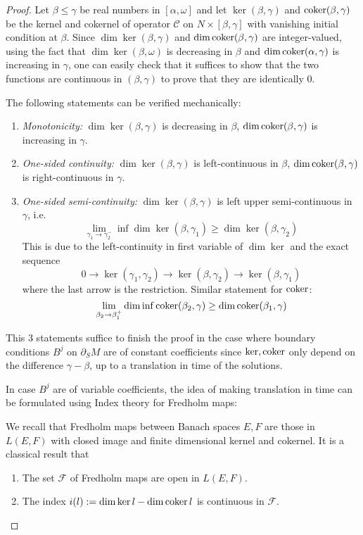 \begin{proof}
Let \(\beta \leq \gamma\) be real numbers in \([\alpha,\omega]\) and let \(\ker
(\beta,\gamma)\) and \(\mathop{\rm coker}\nolimits (\beta,\gamma)\) be the kernel and cokernel of operator
\(\mathcal{C}\) on \(N\times [\beta,\gamma]\) with vanishing initial condition at \(\beta\). Since \(\dim \ker (\beta,\gamma)\) and \(\dim\mathop{\rm coker}\nolimits (\beta,\gamma)\) are
integer-valued, using the fact that \(\dim \ker (\beta,\omega)\) is decreasing in \(\beta\) and \(\dim\mathop{\rm coker}\nolimits (\alpha,\gamma)\) is increasing in \(\gamma\), one can
easily check that it suffices to show that the two functions are
continuous in \((\beta,\gamma)\) to prove that they are identically \(0\).

The following statements can be verified mechanically:
\begin{enumerate}
\item \emph{Monotonicity:} \(\dim\ker(\beta,\gamma)\) is decreasing in \(\beta\), \(\dim\mathop{\rm coker}\nolimits
   (\beta,\gamma)\) is increasing in \(\gamma\).
\item \emph{One-sided continuity:} \(\dim \ker (\beta,\gamma)\) is left-continuous in \(\beta\),
\(\dim\mathop{\rm coker}\nolimits (\beta,\gamma)\) is right-continuous in \(\gamma\).
\item \emph{One-sided semi-continuity:} \(\dim\ker (\beta,\gamma)\) is left upper semi-continuous in
\(\gamma\), i.e.
\[
   \lim_{\gamma_1 \to \gamma_2^-} \inf \dim \ker (\beta,\gamma_1) \geq \dim\ker (\beta,\gamma_2)
   \]
This is due to the left-continuity in first variable of \(\dim\ker\) and the exact
sequence
\[
    0 \longrightarrow \ker (\gamma_1,\gamma_2) \longrightarrow \ker(\beta,\gamma_2) \longrightarrow \ker(\beta,\gamma_1)
   \]
 where the last arrow is the restriction. Similar statement for \(\mathop{\rm coker}\nolimits\):
\[
    \lim_{\beta_2 \to \beta_1^+} \dim \inf \mathop{\rm coker}\nolimits (\beta_2,\gamma) \geq \dim\mathop{\rm coker}\nolimits (\beta_1,\gamma)
   \]
\end{enumerate}

This 3 statements suffice to finish the proof in the case where boundary conditions \(B^j\) on \(\partial_S M\) are of constant coefficients since \(\ker, \mathop{\rm coker}\nolimits\)
only depend on the difference \(\gamma -\beta\), up to a translation in time of the solutions.

In case \(B^j\) are of variable coefficients, the idea of making translation in time can
be formulated using Index theory for Fredholm maps:

We recall that Fredholm maps between Banach spaces \(E, F\) are those in \(L(E,F)\) with
closed image and finite dimensional kernel and cokernel. It is a classical result that
\begin{enumerate}
\item The set \(\mathcal{F}\) of Fredholm maps are open in \(L(E,F)\).
\item The index \(i(l):= \dim \ker l - \dim \mathop{\rm coker}\nolimits l\) is continuous in \(\mathcal{F}\).
\end{enumerate}


\end{proof}
